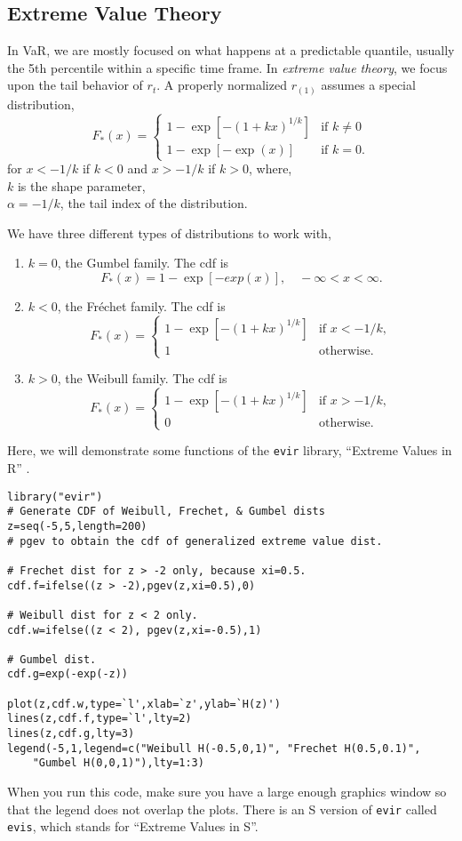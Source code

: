 \subsection{Extreme Value Theory}
In VaR, we are mostly focused on what happens at a predictable quantile, usually the 5th percentile within a specific time frame. In \emph{extreme value theory}, we focus upon the tail behavior of $r_t$. A properly normalized $r_{(1)}$ assumes a special distribution,
\[
F_*(x)=
\begin{cases}
1-\exp[-(1+kx)^{1/k}] & \text{if } k \ne 0 \\
1-\exp[-\exp(x)] & \text{if } k=0.
\end{cases}
\]
for $x<-1/k$ if $k<0$ and $x>-1/k$ if $k>0$,
where, \\
$k$ is the shape parameter, \\
$\alpha =-1/k$, the tail index of the distribution.

\clearpage
We have three different types of distributions to work with,
\begin{enumerate}
\item $k = 0$, the Gumbel family. The cdf is
\[
F_*(x)=1-\exp[-exp(x)], \quad -\infty < x < \infty.
\]
\item $k < 0$, the Fr\'{e}chet family. The cdf is
\[
F_*(x)=
\begin{cases}
1-\exp[-(1+kx)^{1/k}] & \text{if } x< -1/k, \\
1 & \text{otherwise.}
\end{cases}
\]
\item $k>0$, the Weibull family. The cdf is
\[
F_*(x)=
\begin{cases}
1-\exp[-(1+kx)^{1/k}] & \text{if } x>-1/k, \\
0 & \text{otherwise}.
\end{cases}
\]
\end{enumerate}

Here, we will demonstrate some functions of the \texttt{evir} library, ``Extreme Values in R'' \cite{evir-R}.
\begin{verbatim}
library("evir")
# Generate CDF of Weibull, Frechet, & Gumbel dists
z=seq(-5,5,length=200)
# pgev to obtain the cdf of generalized extreme value dist.

# Frechet dist for z > -2 only, because xi=0.5.
cdf.f=ifelse((z > -2),pgev(z,xi=0.5),0)

# Weibull dist for z < 2 only.
cdf.w=ifelse((z < 2), pgev(z,xi=-0.5),1)

# Gumbel dist.
cdf.g=exp(-exp(-z))

plot(z,cdf.w,type=`l',xlab=`z',ylab=`H(z)')
lines(z,cdf.f,type=`l',lty=2)
lines(z,cdf.g,lty=3)
legend(-5,1,legend=c("Weibull H(-0.5,0,1)", "Frechet H(0.5,0.1)",
    "Gumbel H(0,0,1)"),lty=1:3)
\end{verbatim}
When you run this code, make sure you have a large enough graphics window so that the legend does not overlap the plots. There is an S version of \texttt{evir} called \texttt{evis}, which stands for ``Extreme Values in S''.

